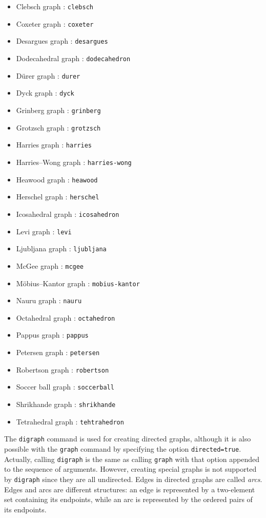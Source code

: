 \documentclass[a4paper,11pt]{article}
\begin{document}
\begin{itemize}
  \item Clebsch graph : {\tt clebsch}
  \item Coxeter graph : {\tt coxeter}
  \item Desargues graph : {\tt desargues}
  \item Dodecahedral graph : {\tt dodecahedron}
  \item D\"urer graph : {\tt durer}
  \item Dyck graph : {\tt dyck}
  \item Grinberg graph : {\tt grinberg}
  \item Grotzsch graph : {\tt grotzsch}
  \item Harries graph : {\tt harries}
  \item Harries--Wong graph : {\tt harries-wong}
  \item Heawood graph : {\tt heawood}
  \item Herschel graph : {\tt herschel}
  \item Icosahedral graph : {\tt icosahedron}
  \item Levi graph : {\tt levi}
  \item Ljubljana graph : {\tt ljubljana}
  \item McGee graph : {\tt mcgee}
  \item M\"obius--Kantor graph : {\tt mobius-kantor}
  \item Nauru graph : {\tt nauru}
  \item Octahedral graph : {\tt octahedron}
  \item Pappus graph : {\tt pappus}
  \item Petersen graph : {\tt petersen}
  \item Robertson graph : {\tt robertson}
  \item Soccer ball graph : {\tt soccerball}
  \item Shrikhande graph : {\tt shrikhande}
  \item Tetrahedral graph : {\tt tehtrahedron}
\end{itemize}

The {\tt digraph} command is used for creating directed graphs, although it is also possible with the {\tt graph} command by specifying the option {\tt directed=true}. Actually, calling {\tt digraph} is the same as calling {\tt graph} with that option appended to the sequence of arguments. However, creating special graphs is not supported by {\tt digraph} since they are all undirected. Edges in directed graphs are called \emph{arcs}. Edges and arcs are different structures: an edge is represented by a two-element set containing its endpoints, while an arc is represented by the ordered pairs of its endpoints.
\end{document}
